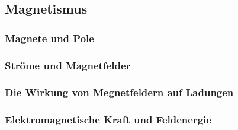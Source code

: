 \subsection{Magnetismus}

\subsubsection{Magnete und Pole}

\subsubsection{Ströme und Magnetfelder}

\subsubsection{Die Wirkung von Megnetfeldern auf Ladungen}

\subsubsection{Elektromagnetische Kraft und Feldenergie}
